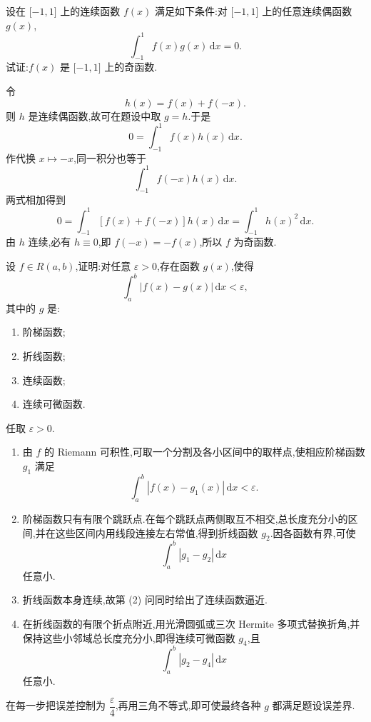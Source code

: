 \begin{example}
    设在 $\lbrack -1,1\rbrack$ 上的连续函数 $f(x)$ 满足如下条件:对 $\lbrack -1,1\rbrack$ 上的任意连续偶函数 $g(x)$,
    \[
        \displaystyle\int_{-1}^{1}f(x)g(x)\,\mathrm{d}x=0.
    \]
    试证:$f(x)$ 是 $\lbrack -1,1\rbrack$ 上的奇函数.
\end{example}
\exampleblank

\begin{solution}
    令
    \[
        h(x)=f(x)+f(-x).
    \]
    则 $h$ 是连续偶函数,故可在题设中取 $g=h$.于是
    \[
        0=\int_{-1}^{1}f(x)h(x)\,\mathrm{d}x.
    \]
    作代换 $x\mapsto-x$,同一积分也等于
    \[
        \displaystyle\int_{-1}^{1}f(-x)h(x)\,\mathrm{d}x.
    \]
    两式相加得到
    \[
        0=\int_{-1}^{1}[f(x)+f(-x)]h(x)\,\mathrm{d}x
        =\int_{-1}^{1}h(x)^2\,\mathrm{d}x.
    \]
    由 $h$ 连续,必有 $h\equiv0$,即 $f(-x)=-f(x)$,所以 $f$ 为奇函数.
\end{solution}

\begin{example}[特殊函数逼近]
    设 $f\in R(a,b)$,证明:对任意 $\varepsilon>0$,存在函数 $g(x)$,使得
    \[
        \displaystyle\int_a^b|f(x)-g(x)|\,\mathrm{d}x<\varepsilon,
    \]
    其中的 $g$ 是:
    \begin{enumerate}
        \item 阶梯函数;
        \item 折线函数;
        \item 连续函数;
        \item 连续可微函数.
    \end{enumerate}
\end{example}
\exampleblank

\begin{solution}
    任取 $\varepsilon>0$.
    \begin{enumerate}
        \item 由 $f$ 的 Riemann 可积性,可取一个分割及各小区间中的取样点,使相应阶梯函数 $g_1$ 满足
              \[
                  \displaystyle\int_a^b|f(x)-g_1(x)|\,\mathrm{d}x<\varepsilon.
              \]

        \item 阶梯函数只有有限个跳跃点.在每个跳跃点两侧取互不相交,总长度充分小的区间,并在这些区间内用线段连接左右常值,得到折线函数 $g_2$.因各函数有界,可使
              \[
                  \displaystyle\int_a^b|g_1-g_2|\,\mathrm{d}x
              \]
              任意小.

        \item 折线函数本身连续,故第 (2) 问同时给出了连续函数逼近.

        \item 在折线函数的有限个折点附近,用光滑圆弧或三次 Hermite 多项式替换折角,并保持这些小邻域总长度充分小,即得连续可微函数 $g_4$,且
              \[
                  \displaystyle\int_a^b|g_2-g_4|\,\mathrm{d}x
              \]
              任意小.
    \end{enumerate}
    在每一步把误差控制为 $\dfrac{\varepsilon}{4}$,再用三角不等式,即可使最终各种 $g$ 都满足题设误差界.
\end{solution}


